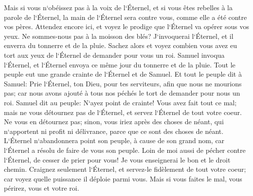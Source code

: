 \verse Mais si vous n`obéissez pas à la voix de l`Éternel, et si vous êtes rebelles à la parole de l`Éternel, la main de l`Éternel sera contre vous, comme elle a été contre vos pères. 
\verse Attendez encore ici, et voyez le prodige que l`Éternel va opérer sous vos yeux. 
\verse Ne sommes-nous pas à la moisson des blés? J`invoquerai l`Éternel, et il enverra du tonnerre et de la pluie. Sachez alors et voyez combien vous avez eu tort aux yeux de l`Éternel de demander pour vous un roi. 
\verse Samuel invoqua l`Éternel, et l`Éternel envoya ce même jour du tonnerre et de la pluie. Tout le peuple eut une grande crainte de l`Éternel et de Samuel. 
\verse Et tout le peuple dit à Samuel: Prie l`Éternel, ton Dieu, pour tes serviteurs, afin que nous ne mourions pas; car nous avons ajouté à tous nos péchés le tort de demander pour nous un roi. 
\verse Samuel dit au peuple: N`ayez point de crainte! Vous avez fait tout ce mal; mais ne vous détournez pas de l`Éternel, et servez l`Éternel de tout votre coeur. 
\verse Ne vous en détournez pas; sinon, vous iriez après des choses de néant, qui n`apportent ni profit ni délivrance, parce que ce sont des choses de néant. 
\verse L`Éternel n`abandonnera point son peuple, à cause de son grand nom, car l`Éternel a résolu de faire de vous son peuple. 
\verse Loin de moi aussi de pécher contre l`Éternel, de cesser de prier pour vous! Je vous enseignerai le bon et le droit chemin. 
\verse Craignez seulement l`Éternel, et servez-le fidèlement de tout votre coeur; car voyez quelle puissance il déploie parmi vous. 
\verse Mais si vous faites le mal, vous périrez, vous et votre roi. 

\chapter{}


